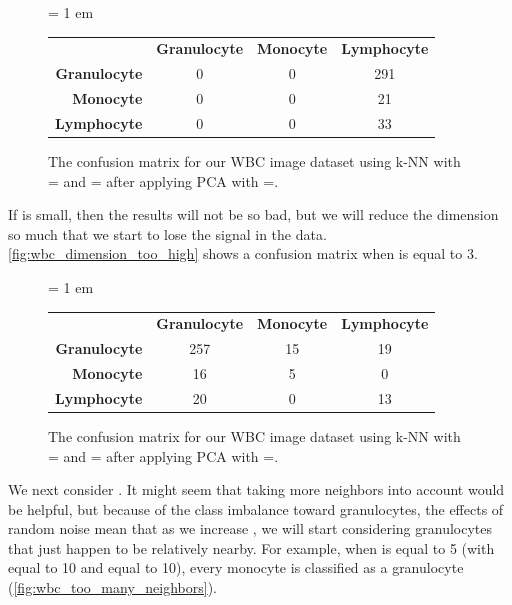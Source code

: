 \begin{figure}[h]
\centering
\tabcolsep = 1 em
\mySfFamily
\begin{tabular}{r c c c}
\rowcolor{gray!50}
& \textbf{Granulocyte} & \textbf{Monocyte} & \textbf{Lymphocyte} \\
\textbf{Granulocyte} & 0 & 0 & 291 \\
\textbf{Monocyte} & 0 & 0 & \phantom{5}21 \\
\textbf{Lymphocyte} & 0 & 0 & \phantom{5}33
\end{tabular}
\caption{The confusion matrix for our WBC image dataset using k-NN with = and = after applying PCA with =.}
\label{fig:wbc_baffling_confusion_matrix}
\end{figure}

If  is small, then the results will not be so bad, but we will reduce the dimension so much that we start to lose the signal in the data.  \autoref{fig:wbc_dimension_too_high} shows a confusion matrix when  is equal to 3.\\

\begin{figure}[h]
\centering
\tabcolsep = 1 em
\mySfFamily
{}
\begin{tabular}{r c c c}
\rowcolor{gray!50}
& \textbf{Granulocyte} & \textbf{Monocyte} & \textbf{Lymphocyte} \\
\textbf{Granulocyte} & 257 & 15 & 19 \\
\textbf{Monocyte} & \phantom{5}16 & \phantom{5}5 & \phantom{5}0 \\
\textbf{Lymphocyte} & \phantom{5}20 & \phantom{5}0 & 13
\end{tabular}
\caption{The confusion matrix for our WBC image dataset using k-NN with = and = after applying PCA with =.}
\label{fig:wbc_dimension_too_high}
\end{figure}

We next consider . It might seem that taking more neighbors into account would be helpful, but because of the class imbalance toward granulocytes, the effects of random noise mean that as we increase , we will start considering granulocytes that just happen to be relatively nearby. For example, when  is equal to 5 (with  equal to 10 and  equal to 10), every monocyte is classified as a granulocyte (\autoref{fig:wbc_too_many_neighbors}).\\

